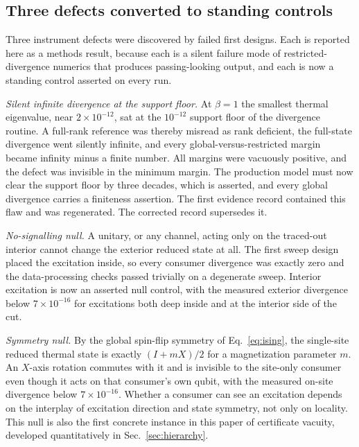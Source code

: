 \documentclass[aps,prd,reprint,nofootinbib,longbibliography]{revtex4-2}
\begin{document}
\subsection{Three defects converted to standing controls}
\label{sec:defects}

Three instrument defects were discovered by failed first designs.  Each is
reported here as a methods result, because each is a silent failure mode of
restricted-divergence numerics that produces passing-looking output, and
each is now a standing control asserted on every run.

\emph{Silent infinite divergence at the support floor.}
At $\beta=1$ the smallest thermal eigenvalue, near $2\times 10^{-12}$, sat
at the $10^{-12}$ support floor of the divergence routine.  A full-rank
reference was thereby misread as rank deficient, the full-state divergence
went silently infinite, and every global-versus-restricted margin became
infinity minus a finite number.  All margins were vacuously positive, and
the defect was invisible in the minimum margin.  The production model must
now clear the support floor by three decades, which is asserted, and every
global divergence carries a finiteness assertion.  The first evidence
record contained this flaw and was regenerated.  The corrected record
supersedes it.

\emph{No-signalling null.}
A unitary, or any channel, acting only on the traced-out interior cannot
change the exterior reduced state at all.  The first sweep design placed
the excitation inside, so every consumer divergence was exactly zero and
the data-processing checks passed trivially on a degenerate sweep.
Interior excitation is now an asserted null control, with the measured
exterior divergence below $7\times 10^{-16}$ for excitations both deep
inside and at the interior side of the cut.

\emph{Symmetry null.}
By the global spin-flip symmetry of Eq.~\eqref{eq:ising}, the single-site
reduced thermal state is exactly $(I+mX)/2$ for a magnetization parameter
$m$.  An $X$-axis rotation commutes with it and is invisible to the
site-only consumer even though it acts on that consumer's own qubit, with
the measured on-site divergence below $7\times 10^{-16}$.  Whether a
consumer can see an excitation depends on the interplay of excitation
direction and state symmetry, not only on locality.  This null is also the
first concrete instance in this paper of certificate vacuity, developed
quantitatively in Sec.~\ref{sec:hierarchy}.
\end{document}
